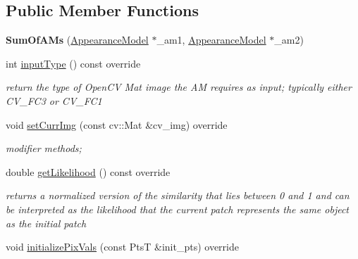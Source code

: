 \subsection*{Public Member Functions}
\begin{DoxyCompactItemize}
\item 
\hypertarget{classSumOfAMs_a0ebb1751fab816ecb426863efd724aba}{{\bfseries Sum\-Of\-A\-Ms} (\hyperlink{classAppearanceModel}{Appearance\-Model} $\ast$\-\_\-am1, \hyperlink{classAppearanceModel}{Appearance\-Model} $\ast$\-\_\-am2)}\label{classSumOfAMs_a0ebb1751fab816ecb426863efd724aba}

\item 
\hypertarget{classSumOfAMs_a1a6c228e1931e84bfe5fc14e9318a52b}{int \hyperlink{classSumOfAMs_a1a6c228e1931e84bfe5fc14e9318a52b}{input\-Type} () const override}\label{classSumOfAMs_a1a6c228e1931e84bfe5fc14e9318a52b}

\begin{DoxyCompactList}\small\item\em return the type of Open\-C\-V Mat image the A\-M requires as input; typically either C\-V\-\_\-F\-C3 or C\-V\-\_\-F\-C1 \end{DoxyCompactList}\item 
\hypertarget{classSumOfAMs_ab800b2c7321d028a1c776d8b12644e4b}{void \hyperlink{classSumOfAMs_ab800b2c7321d028a1c776d8b12644e4b}{set\-Curr\-Img} (const cv\-::\-Mat \&cv\-\_\-img) override}\label{classSumOfAMs_ab800b2c7321d028a1c776d8b12644e4b}

\begin{DoxyCompactList}\small\item\em modifier methods; \end{DoxyCompactList}\item 
\hypertarget{classSumOfAMs_a08100e2aac6d8ee45648f442a2b534e7}{double \hyperlink{classSumOfAMs_a08100e2aac6d8ee45648f442a2b534e7}{get\-Likelihood} () const override}\label{classSumOfAMs_a08100e2aac6d8ee45648f442a2b534e7}

\begin{DoxyCompactList}\small\item\em returns a normalized version of the similarity that lies between 0 and 1 and can be interpreted as the likelihood that the current patch represents the same object as the initial patch \end{DoxyCompactList}\item 
\hypertarget{classSumOfAMs_afbbd2e653918fdda5c973858a1bda0a1}{void \hyperlink{classSumOfAMs_afbbd2e653918fdda5c973858a1bda0a1}{initialize\-Pix\-Vals} (const Pts\-T \&init\-\_\-pts) override}\label{classSumOfAMs_afbbd2e653918fdda5c973858a1bda0a1}


\end{DoxyCompactItemize}

